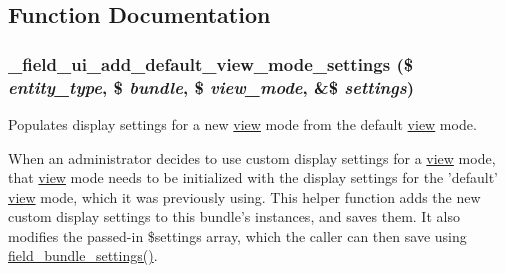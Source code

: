 \subsection{Function Documentation}
\hypertarget{field__ui_8admin_8inc_a444323528e98019f3b4f0f4a9cbb4946}{
\subsubsection[{\_\-field\_\-ui\_\-add\_\-default\_\-view\_\-mode\_\-settings}]{\setlength{\rightskip}{0pt plus 5cm}\_\-field\_\-ui\_\-add\_\-default\_\-view\_\-mode\_\-settings (\$ {\em entity\_\-type}, \/  \$ {\em bundle}, \/  \$ {\em view\_\-mode}, \/  \&\$ {\em settings})}}
\label{field__ui_8admin_8inc_a444323528e98019f3b4f0f4a9cbb4946}
Populates display settings for a new \hyperlink{classview}{view} mode from the default \hyperlink{classview}{view} mode.

When an administrator decides to use custom display settings for a \hyperlink{classview}{view} mode, that \hyperlink{classview}{view} mode needs to be initialized with the display settings for the 'default' \hyperlink{classview}{view} mode, which it was previously using. This helper function adds the new custom display settings to this bundle's instances, and saves them. It also modifies the passed-\/in \$settings array, which the caller can then save using \hyperlink{group__field_gab6416216c1491d34f1bdc7ce38abfe8c}{field\_\-bundle\_\-settings()}.


